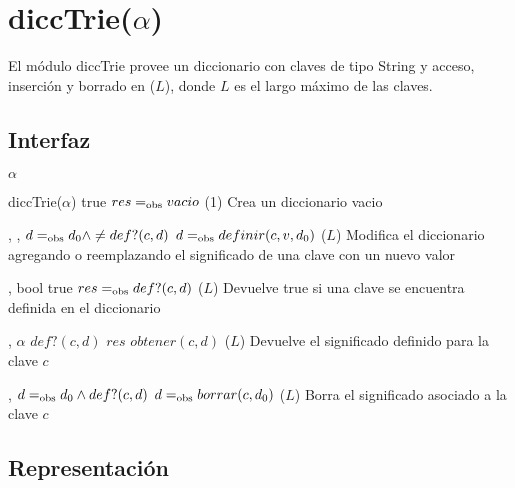 \section{diccTrie($\alpha$)}

El módulo diccTrie provee un diccionario con claves de tipo String y acceso, inserción y borrado en \bigo($L$), donde $L$ es el largo máximo de las claves.

\subsection{Interfaz}

\begin{iparamformales}{$\alpha$}

\end{iparamformales}

\iusa{}
\ioperaciones

{}
{diccTrie($\alpha$)}
{true}
{$res =_{\mathrm{obs}} vacio$}
{\bigo(1)}
{}
{Crea un diccionario vacio}

{   ,
    ,
    }
{}
{$d =_{\mathrm{obs}} d_0 \land \neq def?(c, d)$}
{$d =_{\mathrm{obs}} definir(c, v, d_0)$}
{\bigo($L$)}
{Modifica el diccionario agregando o reemplazando el significado de una clave 
    con un nuevo valor}

{   ,
    }
{bool}
{true}
{$res =_{\mathrm{obs}} def?(c, d)$}
{\bigo($L$)}
{}
{Devuelve true si una clave se encuentra definida en el diccionario}

{   ,
    }
{$\alpha$}
{$def?(c, d)$}
{$res$ \igobs $obtener(c, d)$}
{\bigo($L$)}
{}
{Devuelve el significado definido para la clave $c$}

{   ,
    }
{}
{$d =_{\mathrm{obs}} d_0 \land def?(c, d)$}
{$d =_{\mathrm{obs}} borrar(c, d_0)$}
{\bigo($L$)}
{}
{Borra el significado asociado a la clave $c$}



\subsection{Representación}


